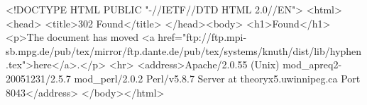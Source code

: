 <!DOCTYPE HTML PUBLIC "-//IETF//DTD HTML 2.0//EN">
<html><head>
<title>302 Found</title>
</head><body>
<h1>Found</h1>
<p>The document has moved <a href="ftp://ftp.mpi-sb.mpg.de/pub/tex/mirror/ftp.dante.de/pub/tex/systems/knuth/dist/lib/hyphen.tex">here</a>.</p>
<hr>
<address>Apache/2.0.55 (Unix) mod_apreq2-20051231/2.5.7 mod_perl/2.0.2 Perl/v5.8.7 Server at theoryx5.uwinnipeg.ca Port 8043</address>
</body></html>
